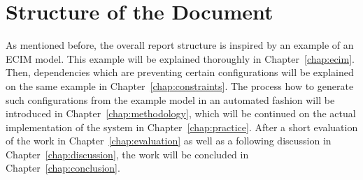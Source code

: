 \section{Structure of the Document}\label{sec:structure}


As mentioned before, the overall report structure is inspired by an example of an ECIM model.
This example will be explained thoroughly in Chapter~\ref{chap:ecim}. Then, dependencies which are preventing certain configurations will be explained on the same example in Chapter~\ref{chap:constraints}. The process how to generate such configurations from the example model in an automated fashion will be introduced in Chapter~\ref{chap:methodology}, which will be continued on the actual implementation of the system in Chapter~\ref{chap:practice}. After a short evaluation of the work in Chapter~\ref{chap:evaluation} as well as a following discussion in Chapter~\ref{chap:discussion}, the work will be concluded in Chapter~\ref{chap:conclusion}.
